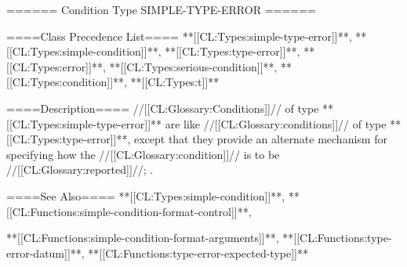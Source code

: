 ====== Condition Type SIMPLE-TYPE-ERROR ======

====Class Precedence List====
**[[CL:Types:simple-type-error]]**, **[[CL:Types:simple-condition]]**, **[[CL:Types:type-error]]**, **[[CL:Types:error]]**, **[[CL:Types:serious-condition]]**, **[[CL:Types:condition]]**, **[[CL:Types:t]]**

====Description====
//[[CL:Glossary:Conditions]]// of type **[[CL:Types:simple-type-error]]** are like //[[CL:Glossary:conditions]]// of type **[[CL:Types:type-error]]**, except that they provide an alternate mechanism for specifying how the //[[CL:Glossary:condition]]// is to be //[[CL:Glossary:reported]]//; .

====See Also====
**[[CL:Types:simple-condition]]**, **[[CL:Functions:simple-condition-format-control]]**,

**[[CL:Functions:simple-condition-format-arguments]]**, **[[CL:Functions:type-error-datum]]**, **[[CL:Functions:type-error-expected-type]]**

 
